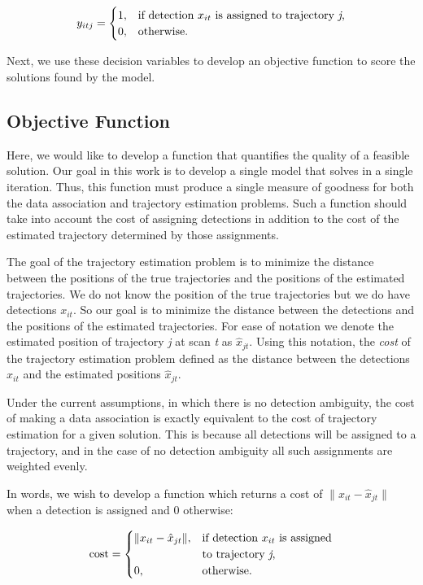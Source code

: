\begin{align}
y_{itj} =
\begin{cases}
1, & \text{if detection $x_{it}$ is assigned to trajectory \textit{j},} \\
0, & \text{otherwise.}
\end{cases}
\end{align}

Next, we use these decision variables to develop an objective function to score the solutions found by the model. 

\subsection{Objective Function}
Here, we would like to develop a function that quantifies the quality of a feasible solution. Our goal in this work is to develop a single model that solves in a single iteration. Thus, this function must produce a single measure of goodness for both the data association and trajectory estimation problems. Such a function should take into account the cost of assigning detections in addition to the cost of the estimated trajectory determined by those assignments. 

The goal of the trajectory estimation problem is to minimize the distance between the positions of the true trajectories and the positions of the estimated trajectories. We do not know the position of the true trajectories but we do have detections $x_{it}$. So our goal is to minimize the distance between the detections and the positions of the estimated trajectories. For ease of notation we denote the estimated position of trajectory \textit{j} at scan \textit{t} as $\hat{x}_{jt}$. Using this notation, the \textit{cost} of the trajectory estimation problem defined as the distance between the detections $x_{it}$ and the estimated positions $\hat{x}_{jt}$. 

Under the current assumptions, in which there is no detection ambiguity, the cost of making a data association is exactly equivalent to the cost of trajectory estimation for a given solution. This is because all detections will be assigned to a trajectory, and in the case of no detection ambiguity all such assignments are weighted evenly. 

In words, we wish to develop a function which returns a cost of $\|x_{it} - \hat{x}_{jt}\|$ when a detection is assigned and 0 otherwise:

\begin{align}
\text{cost} = 
\begin{cases}
\|x_{it} - \hat{x}_{jt}\|, & \text{if detection $x_{it}$ is assigned}\\
				& \text{to trajectory \textit{j},} \\
0, & \text{otherwise.}
\end{cases}
\end{align}

